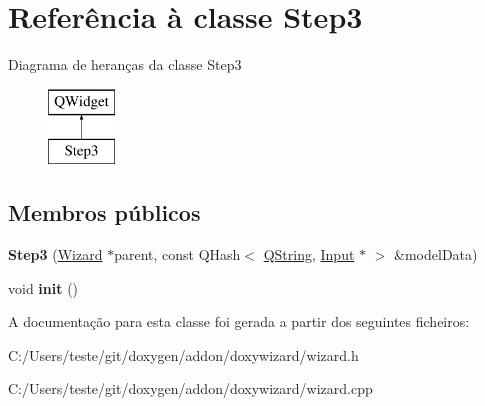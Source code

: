\hypertarget{class_step3}{\section{Referência à classe Step3}
\label{class_step3}
}
Diagrama de heranças da classe Step3\begin{figure}[H]
\begin{center}
\leavevmode
\includegraphics[height=2.000000cm]{class_step3}
\end{center}
\end{figure}
\subsection*{Membros públicos}
\begin{DoxyCompactItemize}
\item 
\hypertarget{class_step3_a63937762565b526ee0b3e841f2a51163}{{\bfseries Step3} (\hyperlink{class_wizard}{Wizard} $\ast$parent, const Q\-Hash$<$ \hyperlink{class_q_string}{Q\-String}, \hyperlink{class_input}{Input} $\ast$ $>$ \&model\-Data)}\label{class_step3_a63937762565b526ee0b3e841f2a51163}

\item 
\hypertarget{class_step3_a02fd73d861ef2e4aabb38c0c9ff82947}{void {\bfseries init} ()}\label{class_step3_a02fd73d861ef2e4aabb38c0c9ff82947}

\end{DoxyCompactItemize}


A documentação para esta classe foi gerada a partir dos seguintes ficheiros\-:\begin{DoxyCompactItemize}
\item 
C\-:/\-Users/teste/git/doxygen/addon/doxywizard/wizard.\-h\item 
C\-:/\-Users/teste/git/doxygen/addon/doxywizard/wizard.\-cpp\end{DoxyCompactItemize}

